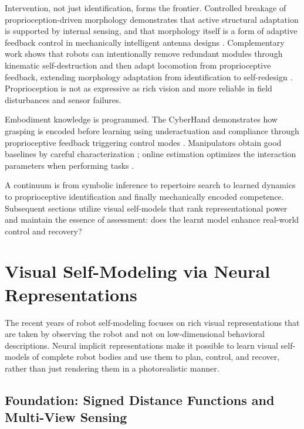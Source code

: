\documentclass[11pt,a4paper]{article}
\begin{document}
Intervention, not just identification, forms the frontier. Controlled breakage of proprioception-driven morphology demonstrates that active structural adaptation is supported by internal sensing, and that morphology itself is a form of adaptive feedback control in mechanically intelligent antenna designs \cite{xu2026antenna}. Complementary work shows that robots can intentionally remove redundant modules through kinematic self-destruction and then adapt locomotion from proprioceptive feedback, extending morphology adaptation from identification to self-redesign \cite{yu2026kinematicself}. Proprioception is not as expressive as rich vision and more reliable in field disturbances and sensor failures.

Embodiment knowledge is programmed. The CyberHand demonstrates how grasping is encoded before learning using underactuation and compliance through proprioceptive feedback triggering control modes \cite{carrozza2006cyberhand}. Manipulators obtain good baselines by careful characterization \cite{tan2026characterization}; online estimation optimizes the interaction parameters when performing tasks \cite{niu2026synchronizedonline}.

A continuum is from symbolic inference to repertoire search to learned dynamics to proprioceptive identification and finally mechanically encoded competence. Subsequent sections utilize visual self-models that rank representational power and maintain the essence of assessment: does the learnt model enhance real-world control and recovery?





\section{Visual Self-Modeling via Neural Representations}
\label{sec:visual_selfmodel}

The recent years of robot self-modeling focuses on rich visual representations that are taken by observing the robot and not on low-dimensional behavioral descriptions. Neural implicit representations make it possible to learn visual self-models of complete robot bodies and use them to plan, control, and recover, rather than just rendering them in a photorealistic manner.

\subsection{Foundation: Signed Distance Functions and Multi-View Sensing}
\end{document}
